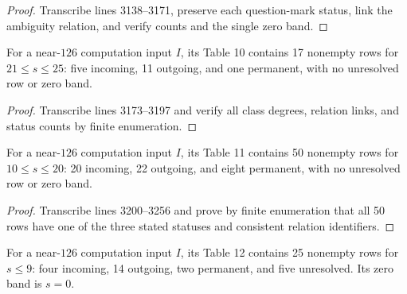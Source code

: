 \begin{proof}
  Transcribe lines 3138--3171, preserve each question-mark status, link the
  ambiguity relation, and verify counts and the single zero band.
\end{proof}

\begin{proposition}
  \label{data:table-s127-high}
  \notready
  For a near-$126$ computation input $I$, its Table 10 contains 17 nonempty rows
  for $21\le s\le25$: five incoming, 11 outgoing, and one permanent, with no
  unresolved row or zero band.
\end{proposition}

\begin{proof}
  Transcribe lines 3173--3197 and verify all class degrees, relation links, and
  status counts by finite enumeration.
\end{proof}

\begin{proposition}
  \label{data:table-s127-middle}
  \notready
  For a near-$126$ computation input $I$, its Table 11 contains 50 nonempty rows
  for $10\le s\le20$: 20 incoming, 22 outgoing, and eight permanent, with no
  unresolved row or zero band.
\end{proposition}

\begin{proof}
  Transcribe lines 3200--3256 and prove by finite enumeration that all 50 rows
  have one of the three stated statuses and consistent relation identifiers.
\end{proof}

\begin{proposition}
  \label{data:table-s127-low}
  \notready
  For a near-$126$ computation input $I$, its Table 12 contains 25 nonempty rows
  for $s\le9$: four incoming, 14 outgoing, two permanent, and five unresolved.
  Its zero band is $s=0$.
\end{proposition}

